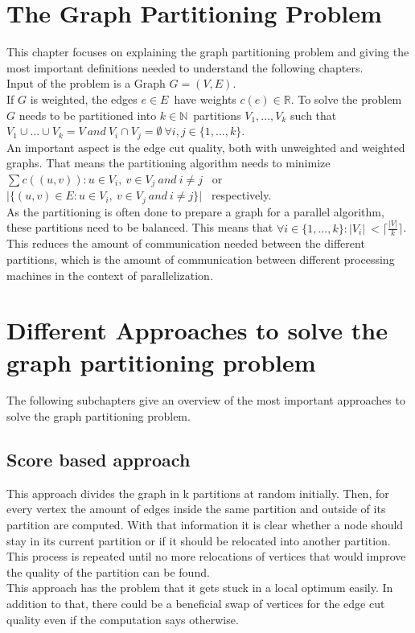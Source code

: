 \documentclass[acmsmall,nonacm,screen,review]{acmart}
\begin{document}
\section{The Graph Partitioning Problem}
This chapter focuses on explaining the graph partitioning problem and giving the most important definitions needed to understand the following chapters.\\
Input of the problem is a Graph $G = (V,E)$.\\
If $G$ is weighted, the edges $e\in E$\ have weights $c(e)\in \mathbb{R} $.
To solve the problem $G$ needs to be partitioned into $k\in \mathbb{N}$\ partitions $V_{1},...,V_{k}$ such that $V_{1}\cup...\cup V_{k} = V\ and\ V_{i}\cap V_{j} = \emptyset\ \forall i,j\in \{1,...,k\}$.\\
An important aspect is the edge cut quality, both with unweighted and weighted graphs. That means the partitioning algorithm needs to minimize 
$\sum c((u,v)) : u\in V_{i},\ v\in V_{j}\ and\ i\neq j$ \ or $\vert \{(u,v)\in E : u\in V_{i},\ v\in V_{j}\ and\ i\neq j \}\vert$ \ respectively.\\
As the partitioning is often done to prepare a graph for a parallel algorithm, these partitions need to be balanced. This means that $\forall i\in \{1,...,k\} : \vert V_{i}\vert \ < \lceil \frac{\vert V \vert }{k} \rceil $. This reduces the amount of communication needed between the different partitions, which is the amount of communication between different processing machines in the context of parallelization.
\section{Different Approaches to solve the graph partitioning problem}
The following subchapters give an overview of the most important approaches to solve the graph partitioning problem.
\subsection{Score based approach}
This approach divides the graph in k partitions at random initially.
Then, for every vertex the amount of edges inside the same partition and outside of its partition are computed. With that information it is clear whether a node should stay in its current partition or if it should be relocated into another partition. This process is repeated until no more relocations of vertices that would improve the quality of the partition can be found.\\
This approach has the problem that it gets stuck in a local optimum easily. In addition to that, there could be a beneficial swap of vertices for the edge cut quality even if the computation says otherwise.
\end{document}
